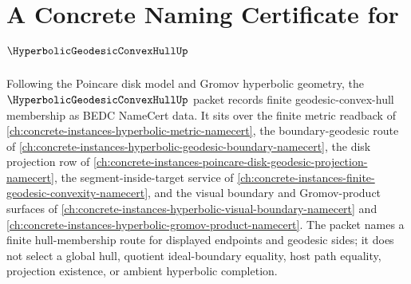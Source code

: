 \chapter{A Concrete Naming Certificate for $\HyperbolicGeodesicConvexHullUp$}
\label{ch:concrete-instances-hyperbolic-geodesic-convex-hull-namecert}

Following the Poincare disk model and Gromov hyperbolic geometry, the $\HyperbolicGeodesicConvexHullUp$ packet records finite geodesic-convex-hull membership as BEDC NameCert data. It sits over the finite metric readback of \autoref{ch:concrete-instances-hyperbolic-metric-namecert}, the boundary-geodesic route of \autoref{ch:concrete-instances-hyperbolic-geodesic-boundary-namecert}, the disk projection row of \autoref{ch:concrete-instances-poincare-disk-geodesic-projection-namecert}, the segment-inside-target service of \autoref{ch:concrete-instances-finite-geodesic-convexity-namecert}, and the visual boundary and Gromov-product surfaces of \autoref{ch:concrete-instances-hyperbolic-visual-boundary-namecert} and \autoref{ch:concrete-instances-hyperbolic-gromov-product-namecert}. The packet names a finite hull-membership route for displayed endpoints and geodesic sides; it does not select a global hull, quotient ideal-boundary equality, host path equality, projection existence, or ambient hyperbolic completion.

